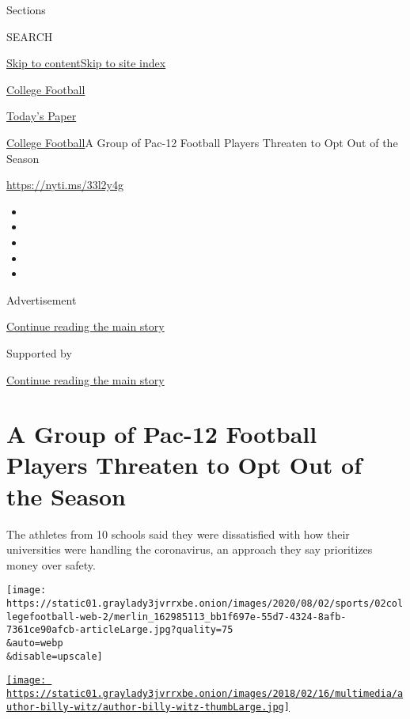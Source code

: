Sections

SEARCH

\protect\hyperlink{site-content}{Skip to
content}\protect\hyperlink{site-index}{Skip to site index}

\href{https://www.nytimes3xbfgragh.onion/section/sports/ncaafootball}{College
Football}

\href{https://myaccount.nytimes3xbfgragh.onion/auth/login?response_type=cookie\&client_id=vi}{}

\href{https://www.nytimes3xbfgragh.onion/section/todayspaper}{Today's
Paper}

\href{/section/sports/ncaafootball}{College Football}\textbar{}A Group
of Pac-12 Football Players Threaten to Opt Out of the Season

\url{https://nyti.ms/33l2y4g}

\begin{itemize}
\item
\item
\item
\item
\item
\end{itemize}

Advertisement

\protect\hyperlink{after-top}{Continue reading the main story}

Supported by

\protect\hyperlink{after-sponsor}{Continue reading the main story}

\hypertarget{a-group-of-pac-12-football-players-threaten-to-opt-out-of-the-season}{%
\section{A Group of Pac-12 Football Players Threaten to Opt Out of the
Season}\label{a-group-of-pac-12-football-players-threaten-to-opt-out-of-the-season}}

The athletes from 10 schools said they were dissatisfied with how their
universities were handling the coronavirus, an approach they say
prioritizes money over safety.

\texttt{[image: https://static01.graylady3jvrrxbe.onion/images/2020/08/02/sports/02collegefootball-web-2/merlin\_162985113\_bb1f697e-55d7-4324-8afb-7361ce90afcb-articleLarge.jpg?quality=75\\\&auto=webp\\\&disable=upscale]}

\href{https://www.nytimes3xbfgragh.onion/by/billy-witz}{\texttt{[image: https://static01.graylady3jvrrxbe.onion/images/2018/02/16/multimedia/author-billy-witz/author-billy-witz-thumbLarge.jpg]}}

